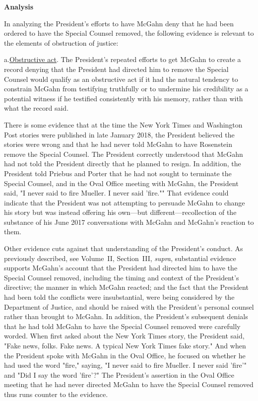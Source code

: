 \begin{center}
\textbf{Analysis}
\end{center}

In analyzing the President's efforts to have McGahn deny that he had been ordered to have the Special Counsel removed, the following evidence is relevant to the elements of obstruction of justice:

a.\qquad\underline{Obstructive act}.
The President's repeated efforts to get McGahn to create a record denying that the President had directed him to remove the Special Counsel would qualify as an obstructive act if it had the natural tendency to constrain McGahn from testifying truthfully or to undermine his credibility as a potential witness if he testified consistently with his memory, rather than with what the record said.

There is some evidence that at the time the New York Times and Washington Post stories were published in late January 2018, the President believed the stories were wrong and that he had never told McGahn to have Rosenstein remove the Special Counsel.
The President correctly understood that McGahn had not told the President directly that he planned to resign.
In addition, the President told Priebus and Porter that he had not sought to terminate the Special Counsel, and in the Oval Office meeting with McGahn, the President said, "I never said to fire Mueller.
I never said 'fire.""
That evidence could indicate that the President was not attempting to persuade McGahn to change his story but was instead offering his own---but different---recollection of the substance of his June 2017 conversations with McGahn and McGahn's reaction to them.

Other evidence cuts against that understanding of the President's conduct.
As previously described, see Volume~II, Section~III, \textit{supra}, substantial evidence supports McGahn's account that the President had directed him to have the Special Counsel removed, including the timing and context of the President's directive;
the manner in which McGahn reacted;
and the fact that the President had been told the conflicts were insubstantial, were being considered by the Department of Justice, and should be raised with the President's personal counsel rather than brought to McGahn.
In addition, the President's subsequent denials that he had told McGahn to have the Special Counsel removed were carefully worded.
When first asked about the New York Times story, the President said, "Fake news, folks.
Fake news.
A typical New York Times fake story." And when the President spoke with McGahn in the Oval Office, he focused on whether he had used the word "fire," saying, "I never said to fire Mueller.
I never said 'fire'" and "Did I say the word 'fire'?" The President's assertion in the Oval Office meeting that he had never directed McGahn to have the Special Counsel removed thus runs counter to the evidence.

